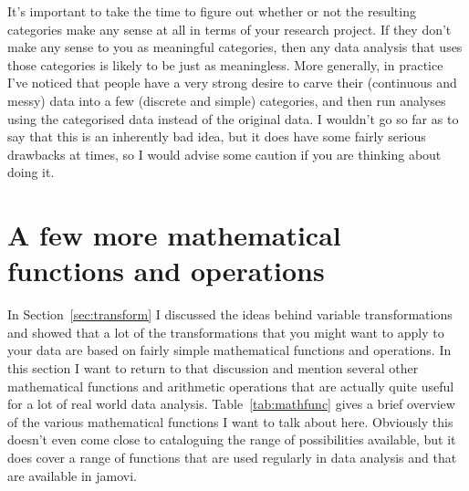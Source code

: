It's important to take the time to figure out whether or not the resulting categories make any sense at all in terms of your research project. If they don't make any sense to you as meaningful categories, then any data analysis that uses those categories is likely to be just as meaningless. More generally, in practice I've noticed that people have a very strong desire to carve their (continuous and messy) data into a few (discrete and simple) categories, and then run analyses using the categorised data instead of the original data. I wouldn't go so far as to say that this is an inherently bad idea, but it does have some fairly serious drawbacks at times, so I would advise some caution if you are thinking about doing it. 


\section{A few more mathematical functions and operations~\label{sec:mathfunc}}

In Section~\ref{sec:transform} I discussed the ideas behind variable transformations and showed that a lot of the transformations that you might want to apply to your data are based on fairly simple mathematical functions and operations. In this section I want to return to that discussion and mention several other mathematical functions and arithmetic operations that are actually quite useful for a lot of real world data analysis. Table~\ref{tab:mathfunc} gives a brief overview of the various mathematical functions I want to talk about here. Obviously this doesn't even come close to cataloguing the range of possibilities available, but it does cover a range of functions that are used regularly in data analysis and that are available in jamovi.

